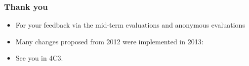 \begin{frame}\frametitle{Thank you}
	\begin{itemize}
		\item	For your feedback via the mid-term evaluations and anonymous evaluations
		\item	Many changes proposed from 2012 were implemented in 2013:
		\item	{See you in 4C3.}
	\end{itemize}
\end{frame}

\begin{frame}\frametitle{}
	\begin{exampleblock}{}
		\begin{center}\huge {}
		\end{center}
	\end{exampleblock}
\end{frame}